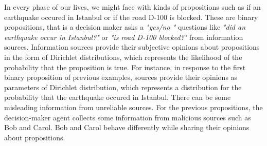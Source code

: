 \documentclass[a4,12pt]{ozu-thesis}
\begin{document}
In every phase of our lives, we might face with kinds of propositions such as if an earthquake occured in Istanbul or if the road D-100 is blocked. These are binary propositions, that is a decision maker asks a \textit{"yes/no "} questions like \textit{"did an earthquake occur in Istanbul?"} or \textit{"is road D-100 blocked?"} from information sources.  Information sources provide their subjective opinions about propositions in the form of Dirichlet distributions, which represents the likelihood of the probability that the proposition is true. For instance, in response to the first binary proposition of previous examples, sources provide their opinions as parameters of Dirichlet distribution, which represents a distribution for the probability that the earthquake occured in Istanbul. There can be some misleading information from unreliable sources. For the previous propositions, the decision-maker agent collects some information from malicious sources such as Bob and Carol. Bob and Carol behave differently while sharing their opinions about propositions. 
\end{document}
